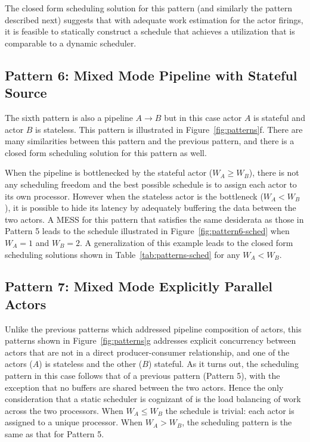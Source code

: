 The closed form scheduling solution for this pattern (and similarly
the pattern described next) suggests that with adequate work
estimation for the actor firings, it is feasible to statically
construct a schedule that achieves a utilization that is comparable to
a dynamic scheduler.

\subsection{Pattern 6: Mixed Mode Pipeline with Stateful Source}

The sixth pattern is also a pipeline $A\rightarrow B$ but in this case
actor $A$ is stateful and actor $B$ is stateless. This pattern is
illustrated in Figure~\ref{fig:patterns}f. There are many similarities
between this pattern and the previous pattern, and there is a closed
form scheduling solution for this pattern as well. 

When the pipeline is bottlenecked by the stateful actor ($W_A \ge
W_B$), there is not any scheduling freedom and the best possible
schedule is to assign each actor to its own processor. However when
the stateless actor is the bottleneck ($W_A < W_B$), it is possible to
hide its latency by adequately buffering the data between the two
actors. A MESS for this pattern that satisfies the same desiderata as
those in Pattern 5 leads to the schedule illustrated in
Figure~\ref{fig:pattern6-sched} when $W_A = 1$ and $W_B = 2$.  A
generalization of this example leads to the closed form scheduling
solutions shown in Table~\ref{tab:patterns-sched} for any $W_A < W_B$.


\subsection{Pattern 7: Mixed Mode Explicitly Parallel Actors}

Unlike the previous patterns which addressed pipeline composition of
actors, this patterns shown in Figure~\ref{fig:patterns}g addresses
explicit concurrency between actors that are not in a direct
producer-consumer relationship, and one of the actors ($A$) is
stateless and the other ($B$) stateful. As it turns out, the
scheduling pattern in this case follows that of a previous pattern
(Pattern 5), with the exception that no buffers are shared between the
two actors. Hence the only consideration that a static scheduler  is
cognizant of is the load balancing of work across the two
processors. When $W_A \le W_B$ the schedule is trivial: each actor is
assigned to a unique processor. When $W_A > W_B$, the scheduling
pattern is the same as that for Pattern 5.

